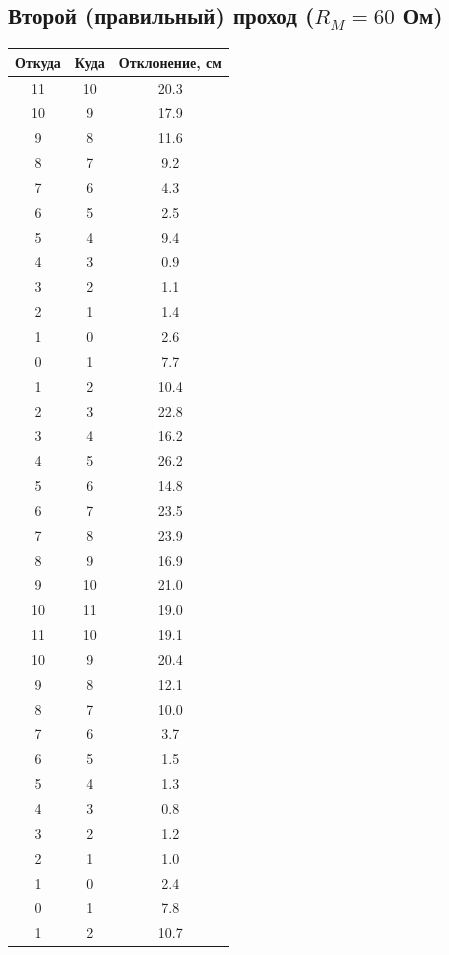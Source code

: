 \documentclass[a4paper]{article}
\begin{document}
\subsection{Второй (правильный) проход ($R_M = 60$ Ом)}

\begin{longtable}{|c|c|c|}
	\hline
	Откуда & Куда & Отклонение, см \\
	\hline
	11 & 10 & 20.3 \\ \hline
	10 & 9 & 17.9 \\ \hline
	9 & 8 & 11.6 \\ \hline
	8 & 7 & 9.2 \\ \hline
	7 & 6 & 4.3 \\ \hline
	6 & 5 & 2.5 \\ \hline
	5 & 4 & 9.4 \\ \hline
	4 & 3 & 0.9 \\ \hline
	3 & 2 & 1.1 \\ \hline
	2 & 1 & 1.4 \\ \hline
	1 & 0 & 2.6 \\ \hline
	0 & 1 & 7.7 \\ \hline
	1 & 2 & 10.4 \\ \hline
	2 & 3 & 22.8 \\ \hline
	3 & 4 & 16.2 \\ \hline
	4 & 5 & 26.2 \\ \hline
	5 & 6 & 14.8 \\ \hline
	6 & 7 & 23.5 \\ \hline
	7 & 8 & 23.9 \\ \hline
	8 & 9 & 16.9 \\ \hline
	9 & 10 & 21.0 \\ \hline
	10 & 11 & 19.0 \\ \hline
	11 & 10 & 19.1 \\ \hline
	10 & 9 & 20.4 \\ \hline
	9 & 8 & 12.1 \\ \hline
	8 & 7 & 10.0 \\ \hline
	7 & 6 & 3.7 \\ \hline
	6 & 5 & 1.5 \\ \hline
	5 & 4 & 1.3 \\ \hline
	4 & 3 & 0.8 \\ \hline
	3 & 2 & 1.2 \\ \hline
	2 & 1 & 1.0 \\ \hline
	1 & 0 & 2.4 \\ \hline
	0 & 1 & 7.8 \\ \hline
	1 & 2 & 10.7 \\ \hline

\end{longtable}
\end{document}
